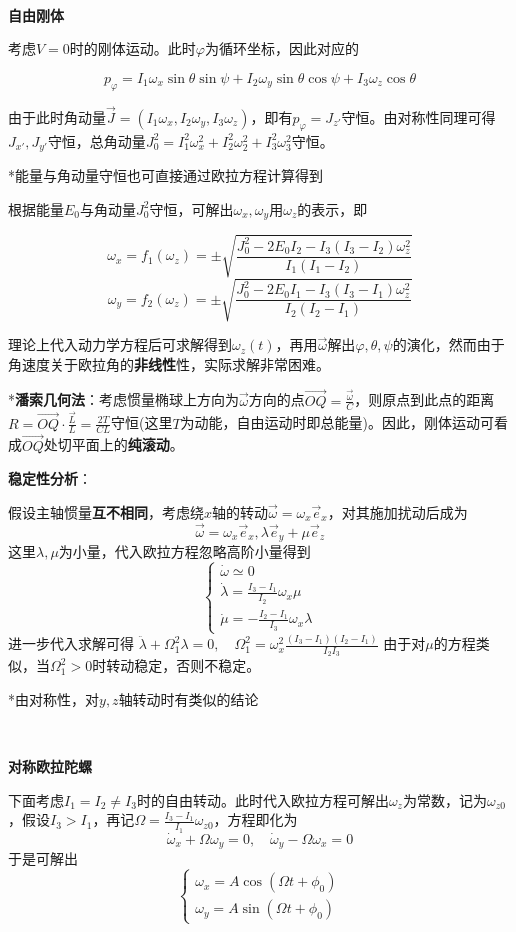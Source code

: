 \documentclass[a4paper,UTF8,fontset=windows]{ctexart}
\begin{document}
\

\textbf{自由刚体}

考虑$V=0$时的刚体运动。此时$\varphi$为循环坐标，因此对应的

$$p_\varphi=I_1\omega_x\sin\theta\sin\psi+I_2\omega_y\sin\theta\cos\psi+I_3\omega_z\cos\theta$$

由于此时角动量$\vec{J}=(I_1\omega_x,I_2\omega_y,I_3\omega_z)$，即有$p_\varphi=J_{z'}$守恒。由对称性同理可得$J_{x'},J_{y'}$守恒，总角动量$J_0^2=I_1^2\omega_x^2+I_2^2\omega_2^2+I_3^2\omega_3^2$守恒。

*能量与角动量守恒也可直接通过欧拉方程计算得到

根据能量$E_0$与角动量$J_0^2$守恒，可解出$\omega_x,\omega_y$用$\omega_z$的表示，即

$$\omega_x=f_1(\omega_z)=\pm\sqrt{\frac{J_0^2-2E_0I_2-I_3(I_3-I_2)\omega_z^2}{I_1(I_1-I_2)}}$$
$$\omega_y=f_2(\omega_z)=\pm\sqrt{\frac{J_0^2-2E_0I_1-I_3(I_3-I_1)\omega_z^2}{I_2(I_2-I_1)}}$$

理论上代入动力学方程后可求解得到$\omega_z(t)$，再用$\vec{\omega}$解出$\varphi,\theta,\psi$的演化，然而由于角速度关于欧拉角的\textbf{非线性}性，实际求解非常困难。

*\textbf{潘索几何法}：考虑惯量椭球上方向为$\vec{\omega}$方向的点$\vec{OQ}=\frac{\vec{\omega}}{C}$，则原点到此点的距离$R=\vec{OQ}\cdot\frac{\vec{L}}{L}=\frac{2T}{CL}$守恒(这里$T$为动能，自由运动时即总能量)。因此，刚体运动可看成$\vec{OQ}$处切平面上的\textbf{纯滚动}。

\textbf{稳定性分析}：

假设主轴惯量\textbf{互不相同}，考虑绕$x$轴的转动$\vec{\omega}=\omega_x\vec{e}_x$，对其施加扰动后成为
$$\vec{\omega}=\omega_x\vec{e}_x,\lambda\vec{e}_y+\mu\vec{e}_z$$
这里$\lambda,\mu$为小量，代入欧拉方程忽略高阶小量得到
$$\begin{cases}\dot{\omega}\simeq0\\\dot{\lambda}=\frac{I_3-I_1}{I_2}\omega_x\mu\\\dot{\mu}=-\frac{I_2-I_1}{I_3}\omega_x\lambda\end{cases}$$
进一步代入求解可得
$\ddot{\lambda}+\Omega_1^2\lambda=0,\quad\Omega_1^2=\omega_x^2\frac{(I_3-I_1)(I_2-I_1)}{I_2I_3}$
由于对$\mu$的方程类似，当$\Omega_1^2>0$时转动稳定，否则不稳定。

*由对称性，对$y,z$轴转动时有类似的结论

\

\textbf{对称欧拉陀螺}

下面考虑$I_1=I_2\ne I_3$时的自由转动。此时代入欧拉方程可解出$\omega_z$为常数，记为$\omega_{z0}$，假设$I_3>I_1$，再记$\Omega=\frac{I_3-I_1}{I_1}\omega_{z0}$，方程即化为
$$\dot{\omega}_x+\Omega\omega_y=0,\quad\dot{\omega}_y-\Omega\omega_x=0$$
于是可解出
$$\begin{cases}\omega_x=A\cos(\Omega t+\phi_0)\\\omega_y=A\sin(\Omega t+\phi_0)\end{cases}$$
\end{document}
